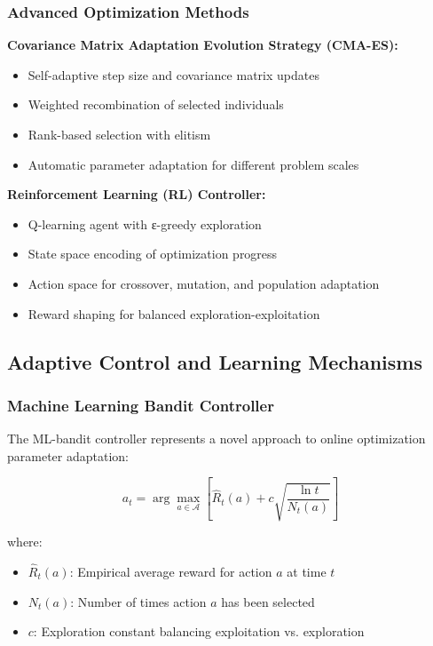 \documentclass[12pt,a4paper]{article}
\begin{document}
\subsubsection{Advanced Optimization Methods}

\textbf{Covariance Matrix Adaptation Evolution Strategy (CMA-ES):}
\begin{itemize}
    \item Self-adaptive step size and covariance matrix updates
    \item Weighted recombination of selected individuals
    \item Rank-based selection with elitism
    \item Automatic parameter adaptation for different problem scales
\end{itemize}

\textbf{Reinforcement Learning (RL) Controller:}
\begin{itemize}
    \item Q-learning agent with ε-greedy exploration
    \item State space encoding of optimization progress
    \item Action space for crossover, mutation, and population adaptation
    \item Reward shaping for balanced exploration-exploitation
\end{itemize}

\subsection{Adaptive Control and Learning Mechanisms}

\subsubsection{Machine Learning Bandit Controller}

The ML-bandit controller represents a novel approach to online optimization parameter adaptation:

\begin{equation}
a_t = \arg\max_{a \in \mathcal{A}} \left[ \hat{R}_t(a) + c \sqrt{\frac{\ln t}{N_t(a)}} \right]
\end{equation}

where:
\begin{itemize}
    \item $\hat{R}_t(a)$: Empirical average reward for action $a$ at time $t$
    \item $N_t(a)$: Number of times action $a$ has been selected
    \item $c$: Exploration constant balancing exploitation vs. exploration
\end{itemize}
\end{document}
